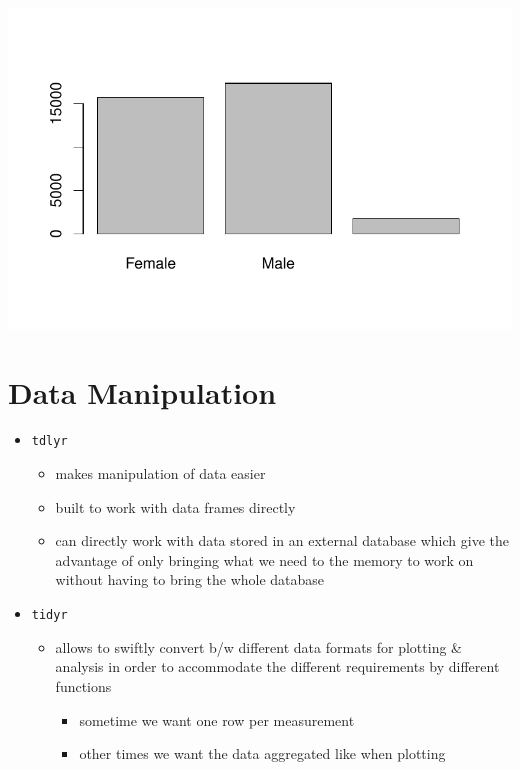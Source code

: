 \documentclass[
  letterpaper,
  DIV=11,
  numbers=noendperiod]{scrreprt}
\providecommand{\tightlist}{%
  \setlength{\itemsep}{0pt}\setlength{\parskip}{0pt}}\usepackage{longtable,booktabs,array}
\begin{document}
\includegraphics{src/notebooks/r_files/figure-pdf/unnamed-chunk-24-1.pdf}

\section{Data Manipulation}\label{data-manipulation}

\begin{itemize}
\tightlist
\item
  \texttt{tdlyr}

  \begin{itemize}
  \tightlist
  \item
    makes manipulation of data easier
  \item
    built to work with data frames directly
  \item
    can directly work with data stored in an external database which
    give the advantage of only bringing what we need to the memory to
    work on without having to bring the whole database
  \end{itemize}
\item
  \texttt{tidyr}

  \begin{itemize}
  \tightlist
  \item
    allows to swiftly convert b/w different data formats for plotting \&
    analysis in order to accommodate the different requirements by
    different functions

    \begin{itemize}
    \tightlist
    \item
      sometime we want one row per measurement
    \item
      other times we want the data aggregated like when plotting
    \end{itemize}
  \end{itemize}
\end{itemize}
\end{document}
